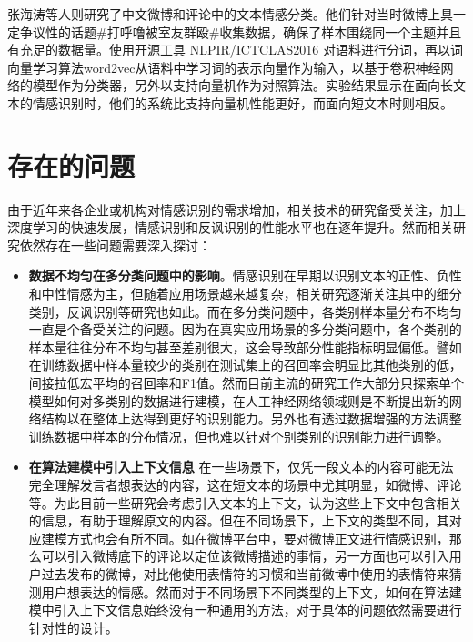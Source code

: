 张海涛等人\cite{zhang2018jiyu}则研究了中文微博和评论中的文本情感分类。他们针对当时微博上具一定争议性的话题\#打呼噜被室友群殴\#收集数据，确保了样本围绕同一个主题并且有充足的数据量。使用开源工具 NLPIR/ICTCLAS2016 对语料进行分词，再以词向量学习算法word2vec从语料中学习词的表示向量作为输入，以基于卷积神经网络的模型作为分类器，另外以支持向量机作为对照算法。实验结果显示在面向长文本的情感识别时，他们的系统比支持向量机性能更好，而面向短文本时则相反。

\section{存在的问题}

由于近年来各企业或机构对情感识别的需求增加，相关技术的研究备受关注，加上深度学习的快速发展，情感识别和反讽识别的性能水平也在逐年提升。然而相关研究依然存在一些问题需要深入探讨：

\begin{itemize}

\item {\bf 数据不均匀在多分类问题中的影响}。情感识别在早期以识别文本的正性、负性和中性情感为主，但随着应用场景越来越复杂，相关研究逐渐关注其中的细分类别，反讽识别等研究也如此。而在多分类问题中，各类别样本量分布不均匀一直是个备受关注的问题。因为在真实应用场景的多分类问题中，各个类别的样本量往往分布不均匀甚至差别很大，这会导致部分性能指标明显偏低。譬如在训练数据中样本量较少的类别在测试集上的召回率会明显比其他类别的低，间接拉低宏平均的召回率和F1值。然而目前主流的研究工作大部分只探索单个模型如何对多类别的数据进行建模，在人工神经网络领域则是不断提出新的网络结构以在整体上达得到更好的识别能力。另外也有透过数据增强的方法调整训练数据中样本的分布情况，但也难以针对个别类别的识别能力进行调整。

\item {\bf 在算法建模中引入上下文信息} 在一些场景下，仅凭一段文本的内容可能无法完全理解发言者想表达的内容，这在短文本的场景中尤其明显，如微博、评论等。为此目前一些研究会考虑引入文本的上下文，认为这些上下文中包含相关的信息，有助于理解原文的内容。但在不同场景下，上下文的类型不同，其对应建模方式也会有所不同。如在微博平台中，要对微博正文进行情感识别，那么可以引入微博底下的评论以定位该微博描述的事情，另一方面也可以引入用户过去发布的微博，对比他使用表情符的习惯和当前微博中使用的表情符来猜测用户想表达的情感。然而对于不同场景下不同类型的上下文，如何在算法建模中引入上下文信息始终没有一种通用的方法，对于具体的问题依然需要进行针对性的设计。

\end{itemize}

